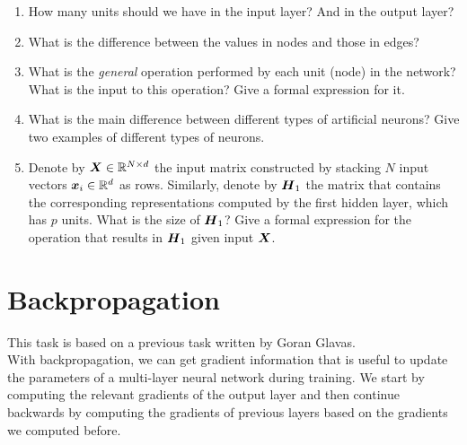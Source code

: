 \documentclass[11pt,a4paper]{article}
\begin{document}
\begin{enumerate}[label=(\alph*)]
    \item How many units should we have in the input layer? And in the output
          layer?
    \item What is the difference between the values in nodes and those in edges?
    \item What is the \emph{general} operation performed by each unit (node) in
          the network? What is the input to this operation? Give a formal
          expression for it.
    \item What is the main difference between different types of artificial
          neurons? Give two examples of different types of neurons.
    \item Denote by ${\boldsymbol{X}}\in\mathbb{R}^{N\times d}$ the input matrix constructed by
          stacking $N$ input vectors ${\boldsymbol{x}}_i\in\mathbb{R}^d$ as rows. Similarly,
          denote by ${\boldsymbol{H}}_1$ the matrix that contains the corresponding
          representations computed by the first hidden layer, which has $p$
          units. What is the size of ${\boldsymbol{H}}_1$? Give a formal expression for the
          operation that results in ${\boldsymbol{H}}_1$ given input ${\boldsymbol{X}}$.
\end{enumerate}

\section{Backpropagation}

This task is based on a previous task written by Goran Glavas. \\

With backpropagation, we can get gradient information that is useful to update
the parameters of a multi-layer neural network during training.
We start by computing the relevant gradients of the output layer and then
continue backwards by computing the gradients of previous layers based on the
gradients we computed before.
\end{document}
